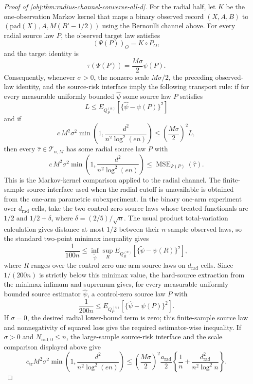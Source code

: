 \documentclass[11pt]{article}
\begin{document}
\begin{proof}[Proof of \cref{obj:thm:radius-channel-converse-all-d}]
For the radial half, let \(K\) be the one-observation Markov kernel that maps a binary observed record \((X,A,B)\) to \((\mathrm{pad}(X),A,M(B'-1/2))\) using the Bernoulli channel above.  For every radial source law \(P\), the observed target law satisfies
\[
(\Psi(P))_O=K\circ P_O,
\]
and the target identity is
\[
\tau(\Psi(P))=\frac{M\sigma}{2}\psi(P).
\]
Consequently, whenever \(\sigma>0\), the nonzero scale \(M\sigma/2\), the preceding observed-law identity, and the source-risk interface imply the following transport rule: if for every measurable uniformly bounded \(\widehat\psi\) some source law \(P\) satisfies
\[
L\le
E_{Q_P^{(n)}}\left[\{\widehat\psi-\psi(P)\}^2\right]
\]
and if
\[
c\,M^2\sigma^2
\min\left(1,\frac{d^2}{n^2\log^2(en)}\right)
\le
\left(\frac{M\sigma}{2}\right)^2L,
\]
then every \(\widehat\tau\in\mathcal T_{n,M}\) has some radial source law \(P\) with
\[
c\,M^2\sigma^2
\min\left(1,\frac{d^2}{n^2\log^2(en)}\right)
\le
\operatorname{MSE}_{\Psi(P)}(\widehat\tau).
\]
This is the Markov-kernel comparison applied to the radial channel.  The finite-sample source interface used when the radial cutoff is unavailable is obtained from the one-arm parametric subexperiment.  In the binary one-arm experiment over \(d_{\mathrm{rad}}\) cells, take the two control-zero source laws whose treated functionals are \(1/2\) and \(1/2+\delta\), where \(\delta=(2/5)/\sqrt n\).  The usual product total-variation calculation gives distance at most \(1/2\) between their \(n\)-sample observed laws, so the standard two-point minimax inequality gives
\[
\frac{1}{100n}
\le
\inf_{\widetilde\psi}
\sup_{R}
E_{Q_R^{(n)}}
\left[
\{\widetilde\psi-\psi(R)\}^2
\right],
\]
where \(R\) ranges over the control-zero one-arm source laws on \(d_{\mathrm{rad}}\) cells.  Since \(1/(200n)\) is strictly below this minimax value, the hard-source extraction from the minimax infimum and supremum gives, for every measurable uniformly bounded source estimator \(\widehat\psi\), a control-zero source law \(P\) with
\[
\frac{1}{200n}
\le
E_{Q_P^{(n)}}
\left[
\{\widehat\psi-\psi(P)\}^2
\right].
\]
If \(\sigma=0\), the desired radial lower-bound term is zero; this finite-sample source law and nonnegativity of squared loss give the required estimator-wise inequality.  If \(\sigma>0\) and \(N_{\mathrm{rad},0}\le n\), the large-sample source-risk interface and the scale comparison displayed above give
\[
c_{\mathrm{tr}}M^2\sigma^2
\min\left(1,\frac{d^2}{n^2\log^2(en)}\right)
\le
\left(\frac{M\sigma}{2}\right)^2
\frac{a_{\mathrm{rad}}}{2}
\left\{\frac1n+\frac{d_{\mathrm{rad}}^2}{n^2\log^2 n}\right\}.
\]
\end{proof}
\end{document}
